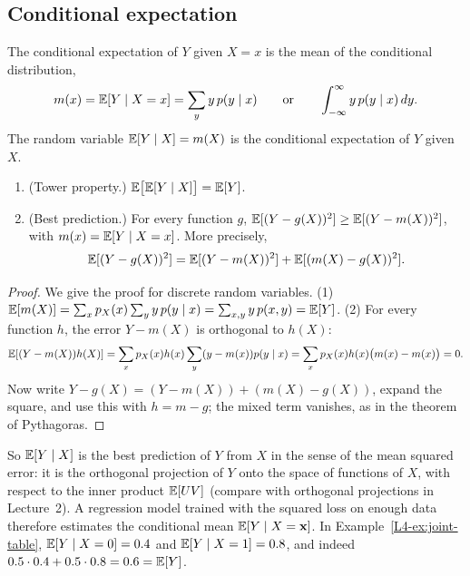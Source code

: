 \subsection{Conditional expectation}\label{L4-sec:conditional-expectation}

\begin{definition}\label{L4-def:conditional-expectation}
    The conditional expectation of $Y$ given $X = x$ is the mean of the conditional distribution,
    \[m(x) = \mathbb{E}[Y \mid X = x] = \sum_y y\,p(y \mid x) \qquad \text{or} \qquad \int_{-\infty}^\infty y\,p(y \mid x) \, dy.\]
    The random variable $\mathbb{E}[Y \mid X] = m(X)$ is the conditional expectation of $Y$ given $X$.
\end{definition}

\begin{theorem}\label{L4-thm:conditional-expectation}
    \begin{enumerate}
        \item (Tower property.) $\mathbb{E}\big[\mathbb{E}[Y \mid X]\big] = \mathbb{E}[Y]$.
        \item (Best prediction.) For every function $g$, $\mathbb{E}[(Y - g(X))^2] \geq \mathbb{E}[(Y - m(X))^2]$, with $m(x) = \mathbb{E}[Y \mid X = x]$. More precisely,
        \[\mathbb{E}[(Y - g(X))^2] = \mathbb{E}[(Y - m(X))^2] + \mathbb{E}[(m(X) - g(X))^2].\]
    \end{enumerate}
\end{theorem}

\begin{proof}
    We give the proof for discrete random variables. (1) $\mathbb{E}[m(X)] = \sum_x p_X(x)\sum_y y\,p(y \mid x) = \sum_{x, y} y\,p(x, y) = \mathbb{E}[Y]$. (2) For every function $h$, the error $Y - m(X)$ is orthogonal to $h(X)$:
    \[\mathbb{E}[(Y - m(X))h(X)] = \sum_x p_X(x)h(x)\sum_y (y - m(x))p(y \mid x) = \sum_x p_X(x)h(x)\big(m(x) - m(x)\big) = 0.\]
    Now write $Y - g(X) = (Y - m(X)) + (m(X) - g(X))$, expand the square, and use this with $h = m - g$; the mixed term vanishes, as in the theorem of Pythagoras.
\end{proof}

So $\mathbb{E}[Y \mid X]$ is the best prediction of $Y$ from $X$ in the sense of the mean squared error: it is the orthogonal projection of $Y$ onto the space of functions of $X$, with respect to the inner product $\mathbb{E}[UV]$ (compare with orthogonal projections in Lecture~2). A regression model trained with the squared loss on enough data therefore estimates the conditional mean $\mathbb{E}[Y \mid X = \mathbf{x}]$. In Example~\ref{L4-ex:joint-table}, $\mathbb{E}[Y \mid X = 0] = 0.4$ and $\mathbb{E}[Y \mid X = 1] = 0.8$, and indeed $0.5 \cdot 0.4 + 0.5 \cdot 0.8 = 0.6 = \mathbb{E}[Y]$.

